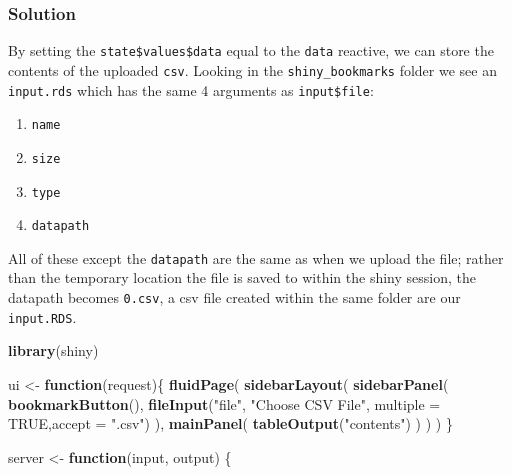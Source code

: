 \documentclass[]{book}
\newenvironment{Shaded}{\begin{snugshade}}{\end{snugshade}}
\newcommand{\ControlFlowTok}[1]{\textcolor[rgb]{0.13,0.29,0.53}{\textbf{#1}}}
\newcommand{\DataTypeTok}[1]{\textcolor[rgb]{0.13,0.29,0.53}{#1}}
\newcommand{\KeywordTok}[1]{\textcolor[rgb]{0.13,0.29,0.53}{\textbf{#1}}}
\newcommand{\NormalTok}[1]{#1}
\newcommand{\OtherTok}[1]{\textcolor[rgb]{0.56,0.35,0.01}{#1}}
\newcommand{\StringTok}[1]{\textcolor[rgb]{0.31,0.60,0.02}{#1}}
\providecommand{\tightlist}{%
  \setlength{\itemsep}{0pt}\setlength{\parskip}{0pt}}
\begin{document}
\begin{solution}

\hypertarget{solution-1}{%
\subsubsection*{Solution}\label{solution-1}}

By setting the \texttt{state\$values\$data} equal to the \texttt{data} reactive, we can store the contents of the uploaded \texttt{csv}. Looking in the \texttt{shiny\_bookmarks} folder we see an \texttt{input.rds} which has the same 4 arguments as \texttt{input\$file}:

\begin{enumerate}
\def\labelenumi{\arabic{enumi}.}
\tightlist
\item
  \texttt{name}
\item
  \texttt{size}
\item
  \texttt{type}
\item
  \texttt{datapath}
\end{enumerate}

All of these except the \texttt{datapath} are the same as when we upload the file; rather than the temporary location the file is saved to within the shiny session, the datapath becomes \texttt{0.csv}, a csv file created within the same folder are our \texttt{input.RDS}.

\begin{Shaded}
\begin{Highlighting}[]
\KeywordTok{library}\NormalTok{(shiny)}

\NormalTok{ui <-}\StringTok{ }\ControlFlowTok{function}\NormalTok{(request)\{}
    \KeywordTok{fluidPage}\NormalTok{(}
        \KeywordTok{sidebarLayout}\NormalTok{(}
            \KeywordTok{sidebarPanel}\NormalTok{(}
                \KeywordTok{bookmarkButton}\NormalTok{(),}
                \KeywordTok{fileInput}\NormalTok{(}\StringTok{"file"}\NormalTok{, }\StringTok{"Choose CSV File"}\NormalTok{, }\DataTypeTok{multiple =} \OtherTok{TRUE}\NormalTok{,}\DataTypeTok{accept =} \StringTok{".csv"}\NormalTok{)}
\NormalTok{                ),}
            \KeywordTok{mainPanel}\NormalTok{(}
                \KeywordTok{tableOutput}\NormalTok{(}\StringTok{"contents"}\NormalTok{)}
\NormalTok{            )}
\NormalTok{        )}
\NormalTok{    )}
\NormalTok{\}}


\NormalTok{server <-}\StringTok{ }\ControlFlowTok{function}\NormalTok{(input, output) \{}


\end{Highlighting}
\end{Shaded}
\end{solution}
\end{document}
